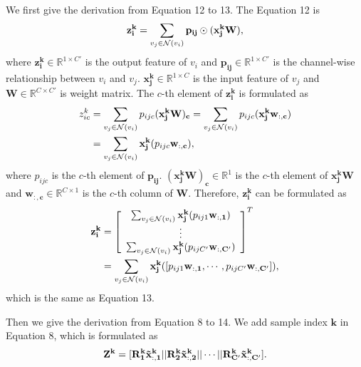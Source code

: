\documentclass[10pt,twocolumn,letterpaper]{article}
\begin{document}
We first give the derivation from Equation {\color{blue}12} to {\color{blue}13}. The Equation {\color{blue}12} is
\vspace{-0.16cm}
\begin{equation}
\vspace{-0.16cm}
\mathbf{z^k_i}=\sum_{v_j \in \mathcal{N}(v_i)}\mathbf{p_{ij}}\odot (\mathbf{x^k_jW}),
\end{equation}
where $\mathbf{z^k_i} \in \mathbb{R}^{1\times C'}$ is the output feature of $v_i$ and $\mathbf{p_{ij}}\in \mathbb{R}^{1\times C'}$ is the channel-wise relationship between $v_i$ and $v_j$. $\mathbf{x^k_j}\in \mathbb{R}^{1\times C}$ is the input feature of $v_j$ and $\mathbf{W}\in \mathbb{R}^{C\times C'}$ is weight matrix. The $c$-th element of $\mathbf{z^k_i}$ is formulated as
\vspace{-0.16cm}
\begin{align}
z^k_{ic}&=\sum_{v_j \in \mathcal{N}(v_i)}p_{ijc}\mathbf{(x^k_jW)_c}=\sum_{v_j \in \mathcal{N}(v_i)}p_{ijc}\mathbf{(x^k_jw_{:,c})}\notag\\
\vspace{-0.16cm}
&=\sum_{v_j \in \mathcal{N}(v_i)}\mathbf{x^k_j}(p_{ijc}\mathbf{w_{:,c}}),
\vspace{-0.16cm}
\label{equ:static}
\end{align}
where $p_{ijc}$ is the $c$-th element of $\mathbf{p_{ij}}$.  $\mathbf{(x^k_jW)_c} \in \mathbb{R}^1$ is the $c$-th element of $\mathbf{x^k_jW}$ and $\mathbf{w_{:,c}}\in \mathbb{R}^{C\times 1}$ is the $c$-th column of $\mathbf{W}$. Therefore, $\mathbf{z^k_i}$ can be formulated as
\vspace{-0.16cm}
\begin{align}
\mathbf{z^k_i}&=\left[
\begin{array}{c}
\sum_{v_j \in \mathcal{N}(v_i)}\mathbf{x^k_j}(p_{ij1}\mathbf{w_{:,1}})\\
\vdots\\
\sum_{v_j \in \mathcal{N}(v_i)}\mathbf{x^k_j}(p_{ijC'}\mathbf{w_{:,C'}})
\end{array}
\right]^T \notag\\
&=\sum_{v_j \in \mathcal{N}(v_i)}\mathbf{x^k_j}([p_{ij1}\mathbf{w_{:,1}},\cdots, p_{ijC'}\mathbf{w_{:,C'}}]),
\label{equ:static_reform}
\end{align}
which is the same as Equation {\color{blue}13}.

Then we give the derivation from Equation {\color{blue}8} to {\color{blue}14}. We add sample index $\mathbf{k}$ in Equation {\color{blue}8}, which is formulated as
\vspace{-0.16cm}
\begin{equation}
\vspace{-0.16cm}
\mathbf{Z^k}=[\mathbf{R^k_1\tilde{x}^k_{:,1}} || \mathbf{R^k_2\tilde{x}^k_{:,2}}||\cdots||\mathbf{R^k_{C'}\tilde{x}^k_{:,C'}}].
\end{equation}
\end{document}
